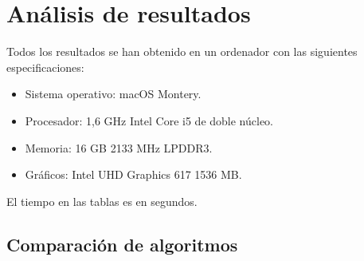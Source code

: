 \documentclass[11pt,a4paper]{article}
\begin{document}
\newpage
\section{Análisis de resultados}
Todos los resultados se han obtenido en un ordenador con las siguientes especificaciones:
\begin{itemize}
\item Sistema operativo: macOS Montery.
\item Procesador: 1,6 GHz Intel Core i5 de doble núcleo.
\item Memoria: 16 GB 2133 MHz LPDDR3.
\item Gráficos: Intel UHD Graphics 617 1536 MB.
\end{itemize}

El tiempo en las tablas es en segundos.

\subsection{Comparación de algoritmos}
\end{document}
